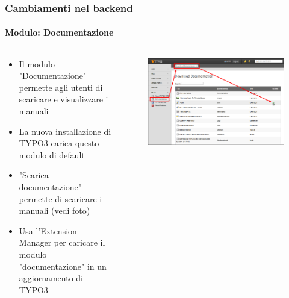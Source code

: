 \begin{frame}[fragile]
	\frametitle{Cambiamenti nel backend}
	\framesubtitle{Modulo: Documentazione}

	\begin{columns}[T]

		\begin{column}{.5\textwidth}
			\begin{itemize}
				\item Il modulo "Documentazione" permette agli utenti di scaricare e visualizzare i manuali
				\item La nuova installazione di TYPO3 carica questo modulo di default
				\item "Scarica documentazione" permette di scaricare i manuali (vedi foto)
				\item Usa l'Extension Manager per caricare il modulo "documentazione" in un aggiornamento di TYPO3
			\end{itemize}
		\end{column}

		\begin{column}{.5\textwidth}
			\begin{figure}\vspace*{-0.4cm}
				\includegraphics[width=1\linewidth]{Images/BackendChanges/DownloadDocumentation.png}
			\end{figure}
		\end{column}

	\end{columns}

\end{frame}


